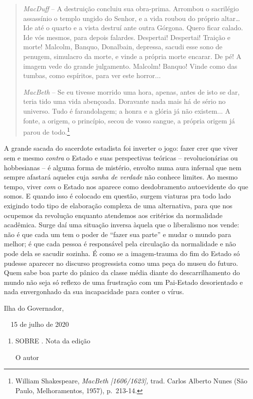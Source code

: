 \begin{quote}
\emph{MacDuff} -- A destruição concluiu sua obra-prima. Arrombou o
sacrilégio assassínio o templo ungido do Senhor, e a vida roubou do
próprio altar\ldots{} Ide até o quarto e a vista destruí ante outra
Górgona. Quero ficar calado. Ide vós mesmos, para depois falardes.
Despertai! Despertai! Traição e morte! Malcolm, Banquo, Donalbain,
depressa, sacudi esse sono de penugem, simulacro da morte, e vinde a
própria morte encarar. De pé! A imagem vede do grande julgamento.
Malcolm! Banquo! Vinde como das tumbas, como espíritos, para ver este
horror...~

\emph{MacBeth} -- Se eu tivesse morrido uma hora, apenas, antes de isto
se dar, teria tido uma vida abençoada. Doravante nada mais há de sério
no universo. Tudo é farandolagem; a honra e a glória já não existem... A
fonte, a origem, o princípio, secou de vosso sangue, a própria origem já
parou de todo.\footnote{William Shakespeare, \emph{MacBeth
  {[}1606/1623{]},} trad. Carlos Alberto Nunes (São Paulo,
  Melhoramentos, 1957), p.~213-14.}
\end{quote}

A grande sacada do sacerdote estadista foi inverter o jogo: fazer crer
que viver sem e mesmo \emph{contra} o Estado e suas perspectivas
teóricas -- revolucionárias ou hobbesianas -- é alguma forma de
mistério, envolto numa aura infernal que nem sempre afastará aqueles
cuja \emph{sanha de verdade} não conhece limites. Ao mesmo tempo, viver
\emph{com} o Estado nos aparece como desdobramento autoevidente do que
somos. E quando isso é colocado em questão, surgem viaturas pra todo
lado exigindo todo tipo de elaboração complexa de uma alternativa, para
que nos ocupemos da revolução enquanto atendemos aos critérios da
normalidade acadêmica. Surge daí uma situação inversa àquela que o
liberalismo nos vende: não é que cada um tem o poder de ``fazer sua
parte'' e mudar o mundo para melhor; é que cada pessoa é responsável
pela circulação da normalidade e não pode dela se sacudir sozinha. É
como se a imagem-trauma do fim do Estado só pudesse aparecer no discurso
progressista como uma peça do museu do futuro. Quem sabe boa parte do
pânico da classe média diante do descarrilhamento do mundo não seja só
reflexo de uma frustração com um Pai-Estado desorientado e nada
envergonhado da sua incapacidade para conter o vírus.

Ilha do Governador,

~~15 de julho de 2020

\begin{enumerate}
\def\labelenumi{\arabic{enumi}.}
\setcounter{enumi}{7}
\item
  SOBRE . Nota da edição

  O autor
\end{enumerate}

